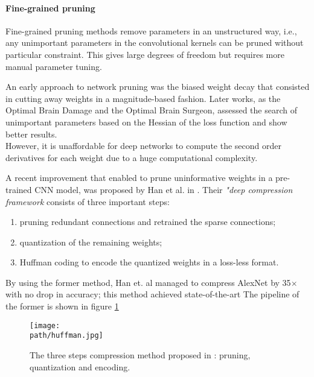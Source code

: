 \newline 

\paragraph{Fine-grained pruning}
Fine-grained pruning methods remove parameters in an unstructured way, i.e., any unimportant parameters in the convolutional kernels can be pruned without particular constraint. This gives large degrees of freedom but requires more manual parameter tuning. 

An early approach to network pruning was the biased weight decay \parencite{pruning-biased} that consisted in cutting away weights in a magnitude-based fashion. Later works, as the Optimal Brain Damage \parencite{brain-damage} and the Optimal Brain Surgeon\parencite{brain-surgeon}, assessed the search of unimportant parameters based on the Hessian of the loss function and show better results. 
\\
However, it is unaffordable for deep networks to compute the second order derivatives for each weight due to a huge computational complexity.  

A recent improvement that enabled to prune uninformative weights in a pre-trained CNN model, was proposed by Han et al. in \parencite{deep-compression}. Their \emph{"deep compression framework} consists of three important steps: 
    \begin{enumerate}
        \item pruning redundant connections and retrained the sparse connections; 
        
        \item quantization of the remaining weights;
        
        \item Huffman coding to encode the quantized weights in a loss-less format.  
    \end{enumerate}

By using the former method, Han et. al managed to compress AlexNet by 35$\times$ with no drop in accuracy; this method achieved state-of-the-art  The pipeline of the former is shown in figure \ref{fig:huffman}


\begin{figure}[h!]
 \centering
 \texttt{[image: \\path/huffman.jpg]} 
 \caption{The three steps compression method proposed in \parencite{deep-compression}: pruning, quantization and encoding.}
 \label{fig:huffman}
\end{figure}

